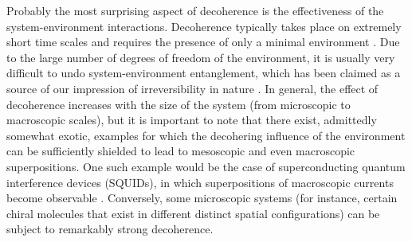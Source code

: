 \documentclass[twocolumn,rmp,aps,amsmath,amsfonts,noshowkeys,noshowpacs]{revtex4}
\begin{document}
Probably the most surprising aspect of decoherence is the
effectiveness of the system-environment interactions. Decoherence
typically takes place on extremely short time scales and requires the
presence of only a minimal environment \citep{Joos:1985:iu}. Due to
the large number of degrees of freedom of the environment, it is
usually very difficult to undo system-environment entanglement, which
has been claimed as a source of our impression of irreversibility in
nature \citep[see, for
example,][]{Zurek:1982:tv,Zurek:2002:ii,Zurek:1994:om,Kiefer:1998:rz,Zeh:2001:tt}.
In general, the effect of decoherence increases with the size of the
system (from microscopic to macroscopic scales), but it is important
to note that there exist, admittedly somewhat exotic, examples for
which the decohering influence of the environment can be sufficiently
shielded to lead to mesoscopic and even macroscopic superpositions.
One such example would be the case of superconducting quantum
interference devices (SQUIDs), in which superpositions of macroscopic
currents become observable \cite{Friedman:2000:rr,Wal:2000:om}.
Conversely, some microscopic systems (for instance, certain chiral
molecules that exist in different distinct spatial configurations) can
be subject to remarkably strong decoherence.
\end{document}
